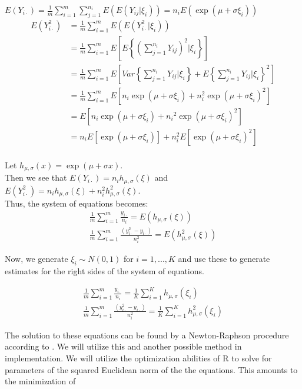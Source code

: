\documentclass[11pt]{article}\usepackage[]{graphicx}\usepackage[]{color}
\begin{document}
$E(Y_{i\cdot})=\frac{1}{m}\sum_{i=1}^m\sum_{j=1}^{n_i} E(E(Y_{ij}|\xi_i))=n_iE(\exp(\mu+\sigma\xi_i))$\\
\begin{align*}
E(Y_{i\cdot}^2)&=\frac{1}{m}\sum_{i=1}^m E(E(Y_{i\cdot}^2|\xi_i))\\
&=\frac{1}{m}\sum_{i=1}^m E\left[E\left\{\left(\sum_{j=1}^{n_i} Y_{ij}\right)^2|\xi_i\right\}\right]\\
&=\frac{1}{m}\sum_{i=1}^m E\left[Var\left\{\sum_{j=1}^{n_i} Y_{ij}|\xi_i\right\}+E\left\{\sum_{j=1}^{n_i} Y_{ij}|\xi_i\right\}^2\right]\\
&=\frac{1}{m}\sum_{i=1}^m E\left[n_i\exp(\mu+\sigma\xi_i)+n_i^2\exp(\mu+\sigma\xi_i)^2\right]\\
&= E\left[n_i\exp(\mu+\sigma\xi_i)+{n_i}^2 \exp(\mu+\sigma\xi_i)^2\right]\\
&= n_iE\left[\exp(\mu+\sigma\xi_i)\right]+n_i^2E\left[ \exp(\mu+\sigma\xi_i)^2\right]\\
\end{align*}

Let $h_{\mu,\sigma}(x)=\exp(\mu+\sigma x)$.\\  Then we see that $E(Y_{i\cdot})=n_ih_{\mu,\sigma}(\xi)$ and  $E(Y_{i\cdot}^2)=n_ih_{\mu,\sigma}(\xi)+n_i^2h_{\mu,\sigma}^2(\xi)$.\\

Thus, the system of equations becomes:
\begin{align*}
\frac{1}{m}\sum_{i=1}^m \frac{y_{i\cdot}}{n_i}=E(h_{\mu,\sigma}(\xi))\\
\frac{1}{m}\sum_{i=1}^m \frac{(y_{i\cdot}^2-y_{i\cdot})}{n_i^2}=E(h_{\mu,\sigma}^2(\xi))
\end{align*}

Now, we generate $\xi_i \sim N(0,1)$ for $i=1,...,K$ and use these to generate estimates for the right sides of the system of equations. 

\begin{align*}
\frac{1}{m}\sum_{i=1}^m \frac{y_{i\cdot}}{n_i}=\frac{1}{K}\sum_{i=1}^K h_{\mu,\sigma}(\xi_i)\\
\frac{1}{m}\sum_{i=1}^m \frac{(y_{i\cdot}^2-y_{i\cdot})}{n_i^2}=\frac{1}{K}\sum_{i=1}^K h_{\mu,\sigma}^2(\xi_i)
\end{align*}

The solution to these equations can be found by a Newton-Raphson procedure according to \cite{jiang}.  We will utilize this and another possible method in implementation.  We will utilize the optimization abilities of R to solve for parameters of the squared Euclidean norm of the the equations.  This amounts to the minimization of 
\end{document}
